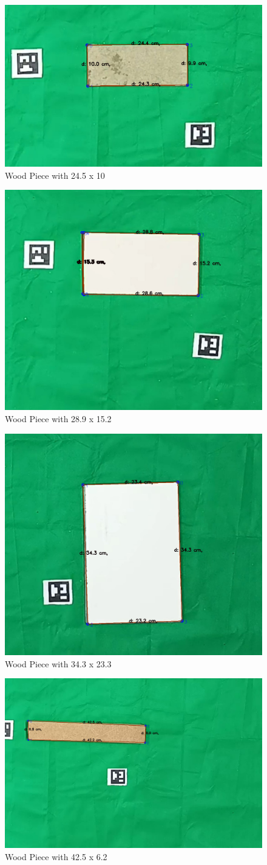 \begin{figure}[H]
    \centering
    \includegraphics[width=0.35\linewidth]{images/Systematic/24.5x10.png}
    \caption{Wood Piece with 24.5 x 10}
    \label{fig:enter-label}
\end{figure}


\begin{figure}[H]
    \centering
    \includegraphics[width=0.35\linewidth]{images/Systematic/28.9x15.2.png}
    \caption{Wood Piece with 28.9 x 15.2}
    \label{fig:enter-label}
\end{figure}


\begin{figure}[H]
    \centering
    \includegraphics[width=0.35\linewidth]{images/Systematic/34.3x23.3.png}
    \caption{Wood Piece with 34.3 x 23.3}
    \label{fig:enter-label}
\end{figure}


\begin{figure}[H]
    \centering
    \includegraphics[width=0.35\linewidth]{images/Systematic/42.5x6.2.png}
    \caption{Wood Piece with 42.5 x 6.2}
    \label{fig:enter-label}
\end{figure}


